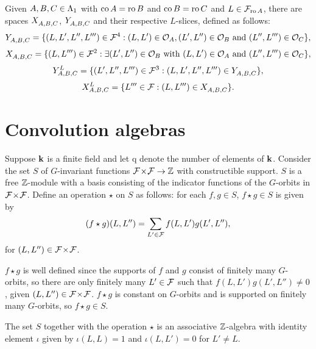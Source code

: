 \documentclass[a4paper, 11pt]{report}
\begin{document}
Given $A,B,C\in\matrices$ with $\co{A}=\ro{B}$ and $\co{B}=\ro{C}$ and $L\in\flags_{\ro{A}}$, there are spaces $\xprod{A,B,C}$, $\yprod{A,B,C}$ and their respective $L$-slices, defined as follows:
\begin{equation*}
\yprod{A,B,C} = \{(L,L',L'',L''')\in\flags^4: (L,L')\in\mathcal{O}_A, (L',L'')\in\mathcal{O}_B \text{ and } (L'',L''')\in\mathcal{O}_C\},
\end{equation*}
\begin{equation*}
\xprod{A,B,C} = \{(L,L''')\in\flags^2: \exists (L',L'')\in\mathcal{O}_B \text{ with } (L,L')\in\mathcal{O}_A \text{ and } (L'',L''')\in\mathcal{O}_C\},
\end{equation*}
\begin{equation*}
\yprod[L]{A,B,C} = \{ (L',L'',L''')\in\flags^3: (L,L',L'',L''')\in\yprod{A,B,C}\},
\end{equation*}
\begin{equation*}
\xprod[L]{A,B,C} = \{ L'''\in\flags: (L,L''')\in\xprod{A,B,C}\}.
\end{equation*}

\section{Convolution algebras}

Suppose $\field$ is a finite field and let $\mathrm{q}$ denote the number of elements of $\field$. Consider the set $S$ of $G$-invariant functions $\dblflags\to\integers$ with constructible support. $S$ is a free $\integers$-module with a basis consisting of the indicator functions of the $G$-orbits in $\dblflags$. Define an operation $\star$ on $S$ as follows: for each $f,g\in S$, $f\star g\in S$ is given by
\begin{equation*}
(f\star g)(L,L'') = \sum_{L'\in\flags} f(L,L')g(L',L''),
\end{equation*}
for $(L,L'')\in\dblflags$. 

$f\star g$ is well defined since the supports of $f$ and $g$ consist of finitely many $G$-orbits, so there are only finitely many $L'\in\flags$ such that $f(L,L')g(L',L'')\neq 0$, given $(L,L'')\in\dblflags$. $f\star g$ is constant on $G$-orbits and is supported on finitely many $G$-orbits, so $f\star g\in S$.

\begin{lemma}\label{lemma:convolution-algebra}
The set $S$ together with the operation $\star$ is an associative $\integers$-algebra with identity element $\iota$ given by $\iota(L,L) = 1$ and $\iota(L,L')=0$ for $L'\neq L$.
\end{lemma}
\end{document}
